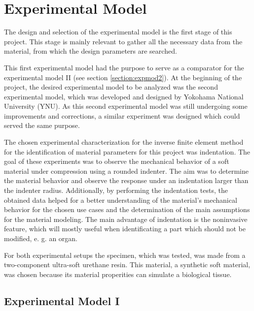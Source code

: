 
\chapter{Experimental Model} %
\label{Chapter3}

The design and selection of the experimental model is the first stage of this project.
This stage is mainly relevant to gather all the necessary data from the material, from which
the design parameters are searched.

This first experimental model had the purpose to serve as a comparator for the experimental 
model II (see section \ref{section:expmod2}). At the beginning of the project, the desired experimental 
model to be analyzed was the second experimental model, which was developed and designed by Yokohama National 
University (YNU). As this second experimental model was still undergoing some improvements and corrections, a similar 
experiment was designed which could served the same purpose.

The chosen experimental characterization for the inverse finite element method for 
 the identification of material parameters for this project was indentation.
The goal of these experiments was to observe the mechanical behavior of a soft material under 
compression using a rounded indenter. The aim was to determine the material behavior and 
observe the response under an indentation larger than the indenter radius. Additionally, 
by performing the indentation tests, the obtained 
data helped for a better understanding of the material's mechanical behavior for the chosen 
use cases and the determination of the main assumptions for the material modeling.
The main advantage of indentation is the noninvasive feature, which will mostly useful when 
identificating a part which should not be modified, e. g. an organ.

For both experimental setups the specimen, which was tested, was made from a two-component ultra-soft urethane resin.
This material, a synthetic soft material, was chosen because its material properities 
can simulate a biological tissue. %
\\ 


\section{Experimental Model I}
\label{section:expmod1}
    
